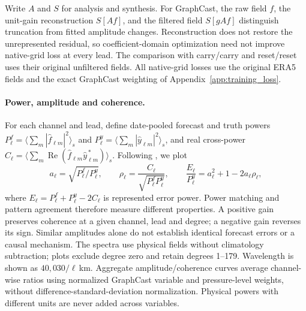 \documentclass{article}
\newcommand{\vfourred}[1]{{\color{red}#1}}
\begin{document}
\vfourred{Write $A$ and $S$ for analysis and synthesis. For GraphCast, the raw field $f$, the unit-gain reconstruction $S[A f]$, and the filtered field $S[g A f]$ distinguish truncation from fitted amplitude changes. Reconstruction does not restore the unrepresented residual, so coefficient-domain optimization need not improve native-grid loss at every lead. The comparison with carry/carry and reset/reset uses their original unfiltered fields. All native-grid losses use the original ERA5 fields and the exact GraphCast weighting of Appendix~\ref{app:training_loss}.}

\paragraph{\vfourred{Power, amplitude and coherence.}}
\vfourred{For each channel and lead, define date-pooled forecast and truth powers $P^f_\ell=\langle\sum_m|\widehat f_{\ell m}|^2\rangle_s$ and $P^y_\ell=\langle\sum_m|\widehat y_{\ell m}|^2\rangle_s$, and real cross-power $C_\ell=\langle\sum_m\operatorname{Re}(\widehat f_{\ell m}\widehat y_{\ell m}^{\,*})\rangle_s$. Following \citet{subich2025spectral}, we plot}
\vfourred{\begin{equation}
a_\ell=\sqrt{P^f_\ell/P^y_\ell},\qquad
\rho_\ell=\frac{C_\ell}{\sqrt{P^f_\ell P^y_\ell}},\qquad
\frac{E_\ell}{P^y_\ell}=a_\ell^2+1-2a_\ell\rho_\ell,
\label{eq:spectral_diagnostics}
\end{equation}}
\vfourred{where $E_\ell=P^f_\ell+P^y_\ell-2C_\ell$ is represented error power. Power matching and pattern agreement therefore measure different properties. A positive gain preserves coherence at a given channel, lead and degree; a negative gain reverses its sign. Similar amplitudes alone do not establish identical forecast errors or a causal mechanism. The spectra use physical fields without climatology subtraction; plots exclude degree zero and retain degrees 1--179. Wavelength is shown as $40{,}030/\ell$\,km. Aggregate amplitude/coherence curves average channel-wise ratios using normalized GraphCast variable and pressure-level weights, without difference-standard-deviation normalization. Physical powers with different units are never added across variables.}
\end{document}
